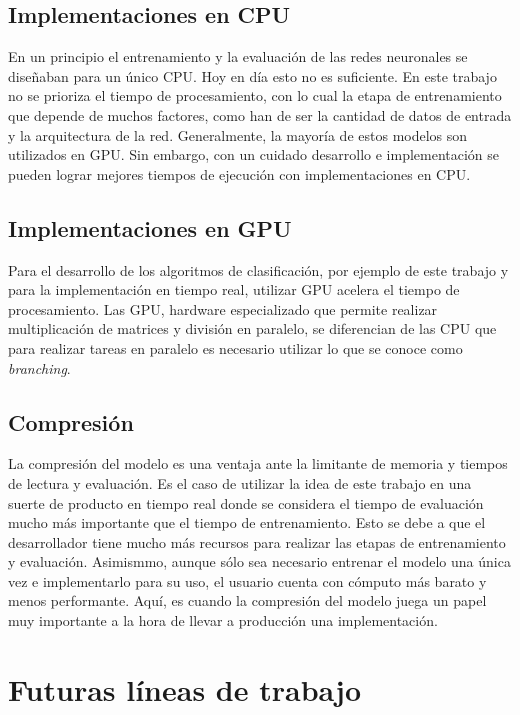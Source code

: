 \subsection*{Implementaciones en CPU}

\indent En un principio el entrenamiento y la evaluación de las redes neuronales se diseñaban para un único CPU. Hoy
en día esto no es suficiente. En este trabajo no se prioriza el tiempo de procesamiento, con lo cual la etapa de
entrenamiento que depende de muchos factores, como han de ser la cantidad de datos de entrada y la arquitectura de
la red. Generalmente, la mayoría de estos modelos son utilizados en GPU. Sin embargo, con un cuidado
desarrollo e implementación se pueden lograr mejores tiempos de ejecución con implementaciones en CPU.

\subsection*{Implementaciones en GPU}

\indent Para el desarrollo de los algoritmos de clasificación, por ejemplo de este trabajo y para la implementación
en tiempo real, utilizar GPU acelera el tiempo de procesamiento. Las GPU, hardware especializado que permite
realizar multiplicación de matrices y división en paralelo, se diferencian de las CPU que para realizar tareas en
paralelo es necesario utilizar lo que se conoce como \textit{branching}.

\subsection*{Compresión}

\indent La compresión del modelo es una ventaja ante la limitante de memoria y tiempos de lectura y evaluación. Es
el caso de utilizar la idea de este trabajo en una suerte de producto en tiempo real donde se considera el tiempo de
evaluación mucho más importante que el tiempo de entrenamiento. Esto se debe a que el desarrollador tiene mucho más
recursos para realizar las etapas de entrenamiento y evaluación. Asimismmo, aunque sólo sea necesario entrenar el
modelo una única vez e implementarlo para su uso, el usuario cuenta con cómputo más barato y menos performante.
Aquí, es cuando la compresión del modelo juega un papel muy importante a la hora de llevar a producción una
implementación.

\section{Futuras líneas de trabajo}

